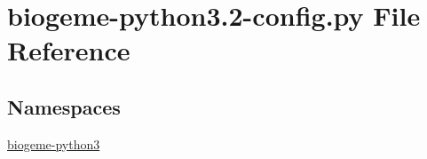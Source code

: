 \hypertarget{biogeme-python3_82-config_8py}{\section{biogeme-\/python3.2-\/config.py File Reference}
\label{biogeme-python3_82-config_8py}
}
\subsection*{Namespaces}
\begin{DoxyCompactItemize}
\item 
 \hyperlink{namespacebiogeme-python3}{biogeme-\/python3}
\end{DoxyCompactItemize}

